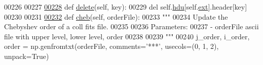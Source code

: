 \begin{DoxyCode}
00226         
00227 
\hypertarget{fits_8py_source_l00228}{}\hyperlink{classpyneb_1_1utils_1_1fits_1_1_hdr_a64e91aa976f1b312026927e9bef237a9}{00228}     \textcolor{keyword}{def }\hyperlink{classpyneb_1_1utils_1_1fits_1_1_hdr_a64e91aa976f1b312026927e9bef237a9}{delete}(self, key):
00229         del self.\hyperlink{classpyneb_1_1utils_1_1fits_1_1_hdr_a23de98701ac30e7c56654f92d9956fca}{hdu}[self.\hyperlink{classpyneb_1_1utils_1_1fits_1_1_hdr_a1c2f102effab05a497e3a21ed3291359}{ext}].header[key]
00230 
00231 
\hypertarget{fits_8py_source_l00232}{}\hyperlink{classpyneb_1_1utils_1_1fits_1_1_hdr_a8b3404b437c53986a68387da48a423f3}{00232}     \textcolor{keyword}{def }\hyperlink{classpyneb_1_1utils_1_1fits_1_1_hdr_a8b3404b437c53986a68387da48a423f3}{cheb}(self, orderFile):    
00233         \textcolor{stringliteral}{""" }
00234 \textcolor{stringliteral}{        Update the Chebyshev order of a coll fits file.}
00235 \textcolor{stringliteral}{        }
00236 \textcolor{stringliteral}{        Parameters:}
00237 \textcolor{stringliteral}{            - orderFile    ascii file with upper level, lower level, order}
00238 \textcolor{stringliteral}{        }
00239 \textcolor{stringliteral}{        """}    
00240         j\_order, i\_order, order = np.genfromtxt(orderFile, comments=\textcolor{stringliteral}{'***'}, usecols=(0, 1, 2), unpack=\textcolor{keyword}{True}) 
         

\end{DoxyCode}
